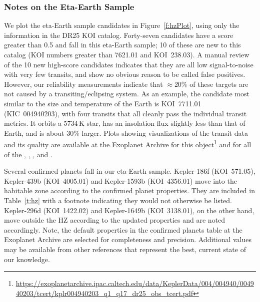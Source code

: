 



\subsubsection{Notes on the Eta-Earth Sample}
We plot the eta-Earth sample candidates in Figure~\ref{f:hzPlot}, using only the information in the DR25 KOI catalog.  Forty-seven candidates have a score greater than 0.5 and fall in this eta-Earth sample; 10 of these are new to this catalog (KOI numbers greater than 7621.01 and KOI~238.03).  A manual review of the 10 new high-score candidates indicates that they are all low signal-to-noise with very few transits, and show no obvious reason to be called false positives. However, our reliability measurements indicate that $\approx$20\% of these targets are not caused by a transiting/eclipsing system. As an example, the candidate most similar to the size and temperature of the Earth is KOI~7711.01 (KIC~004940203), with four transits that all cleanly pass the individual transit metrics. It orbits a 5734\,K star, has an insolation flux slightly less than that of Earth, and is about 30\% larger.  Plots showing visualizations of the transit data and its quality are available at the Exoplanet Archive for this object\footnote{\url{https://exoplanetarchive.ipac.caltech.edu/data/KeplerData/004/004940/004940203/tcert/kplr004940203\_q1\_q17\_dr25\_obs\_tcert.pdf}} and for all of the , , , and .

Several confirmed planets fall in our eta-Earth sample.  Kepler-186f (KOI~571.05), Kepler-439b (KOI~4005.01) and Kepler-1593b (KOI~4356.01) move into the habitable zone according to the confirmed planet properties. They are included in Table~\ref{t:hz} with a footnote indicating they would not otherwise be listed. Kepler-296d (KOI~1422.02) and Kepler-1649b (KOI~3138.01), on the other hand, move outside the HZ according to the updated properties and are noted accordingly. Note, the default properties in the confirmed planets table at the Exoplanet Archive are selected for completeness and precision. Additional values may be available from other references that represent the best, current state of our knowledge.


